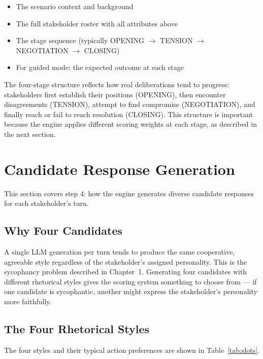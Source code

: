 \documentclass[12pt, a4paper]{report}
\begin{document}
\begin{itemize}[leftmargin=*, itemsep=1pt]
    \item The scenario context and background
    \item The full stakeholder roster with all attributes above
    \item The stage sequence (typically OPENING $\to$ TENSION $\to$ NEGOTIATION $\to$ CLOSING)
    \item For guided mode: the expected outcome at each stage
\end{itemize}

The four-stage structure reflects how real deliberations tend to progress: stakeholders first establish their positions (OPENING), then encounter disagreements (TENSION), attempt to find compromise (NEGOTIATION), and finally reach or fail to reach resolution (CLOSING). This structure is important because the engine applies different scoring weights at each stage, as described in the next section.


\section{Candidate Response Generation}

This section covers step 4: how the engine generates diverse candidate responses for each stakeholder's turn.

\subsection{Why Four Candidates}

A single LLM generation per turn tends to produce the same cooperative, agreeable style regardless of the stakeholder's assigned personality. This is the sycophancy problem described in Chapter~1. Generating four candidates with different rhetorical styles gives the scoring system something to choose from --- if one candidate is sycophantic, another might express the stakeholder's personality more faithfully.

\subsection{The Four Rhetorical Styles}

The four styles and their typical action preferences are shown in Table~\ref{tab:slots}.
\end{document}
